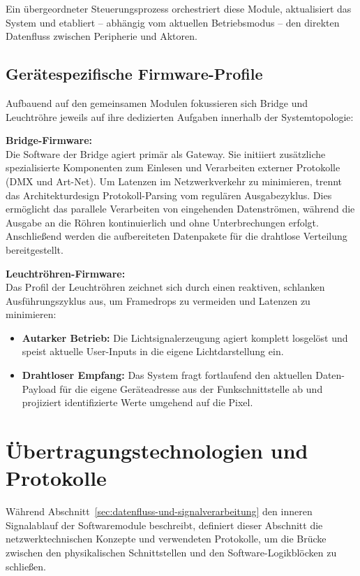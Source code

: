 Ein übergeordneter Steuerungsprozess orchestriert diese Module, aktualisiert das System und 
etabliert – abhängig vom aktuellen Betriebsmodus – den direkten Datenfluss zwischen Peripherie 
und Aktoren.

\subsection{Gerätespezifische Firmware-Profile}
\label{subsec:geraetespezifische-firmware}

Aufbauend auf den gemeinsamen Modulen fokussieren sich Bridge und Leuchtröhre jeweils auf 
ihre dedizierten Aufgaben innerhalb der Systemtopologie:

\textbf{Bridge-Firmware:} \\
Die Software der Bridge agiert primär als Gateway. Sie initiiert 
zusätzliche spezialisierte Komponenten zum Einlesen und Verarbeiten externer Protokolle 
(DMX und Art-Net). Um Latenzen im Netzwerkverkehr zu minimieren, trennt das Architekturdesign 
Protokoll-Parsing vom regulären Ausgabezyklus. 
Dies ermöglicht das parallele Verarbeiten von eingehenden Datenströmen, während die Ausgabe 
an die Röhren kontinuierlich und ohne Unterbrechungen erfolgt.
Anschließend werden die aufbereiteten Datenpakete für die drahtlose Verteilung
bereitgestellt.

\textbf{Leuchtröhren-Firmware:} \\
Das Profil der Leuchtröhren zeichnet sich durch einen reaktiven, schlanken Ausführungszyklus 
aus, um Framedrops zu vermeiden und Latenzen zu minimieren:

\begin{itemize}
    \item \textbf{Autarker Betrieb:} Die Lichtsignalerzeugung agiert komplett losgelöst und speist 
    aktuelle User-Inputs in die eigene Lichtdarstellung ein.
    \item \textbf{Drahtloser Empfang:} Das System fragt fortlaufend den aktuellen Daten-Payload 
    für die eigene Geräteadresse aus der Funkschnittstelle ab und projiziert identifizierte Werte 
    umgehend auf die Pixel.
\end{itemize}

\section{Übertragungstechnologien und Protokolle}
\label{sec:uebertragungstechnologien}

Während Abschnitt~\ref{sec:datenfluss-und-signalverarbeitung} den inneren Signalablauf 
der Softwaremodule beschreibt, definiert dieser Abschnitt die netzwerktechnischen Konzepte und 
verwendeten Protokolle, um die Brücke zwischen den physikalischen Schnittstellen und 
den Software-Logikblöcken zu schließen.

